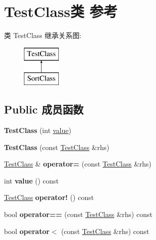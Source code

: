 \hypertarget{class_test_class}{}\section{Test\+Class类 参考}
\label{class_test_class}
类 Test\+Class 继承关系图\+:\begin{figure}[H]
\begin{center}
\leavevmode
\includegraphics[height=2.000000cm]{class_test_class}
\end{center}
\end{figure}
\subsection*{Public 成员函数}
\begin{DoxyCompactItemize}
\item 
\mbox{\label{class_test_class_a4989e996155a6cfb0d47bde02b6fc013}} 
{\bfseries Test\+Class} (int \hyperlink{unionvalue}{value})
\item 
\mbox{\label{class_test_class_aa0c1ffe204a2a63b06bb64e500680c5c}} 
{\bfseries Test\+Class} (const \hyperlink{class_test_class}{Test\+Class} \&rhs)
\item 
\mbox{\label{class_test_class_aec02102147ee1a45340e1e5381c7b4f4}} 
\hyperlink{class_test_class}{Test\+Class} \& {\bfseries operator=} (const \hyperlink{class_test_class}{Test\+Class} \&rhs)
\item 
\mbox{\label{class_test_class_a8ba50eab11e577f88a4b84082e6dd8f8}} 
int {\bfseries value} () const
\item 
\mbox{\label{class_test_class_a271860860128b3103d560fc9e5a7cd14}} 
\hyperlink{class_test_class}{Test\+Class} {\bfseries operator!} () const
\item 
\mbox{\label{class_test_class_accf9b093e95fde36a6fcdb523b81d4d0}} 
bool {\bfseries operator==} (const \hyperlink{class_test_class}{Test\+Class} \&rhs) const
\item 
\mbox{\label{class_test_class_a5bfa837dd730d2b3731bdeab45ef98ee}} 
bool {\bfseries operator$<$} (const \hyperlink{class_test_class}{Test\+Class} \&rhs) const
\end{DoxyCompactItemize}
